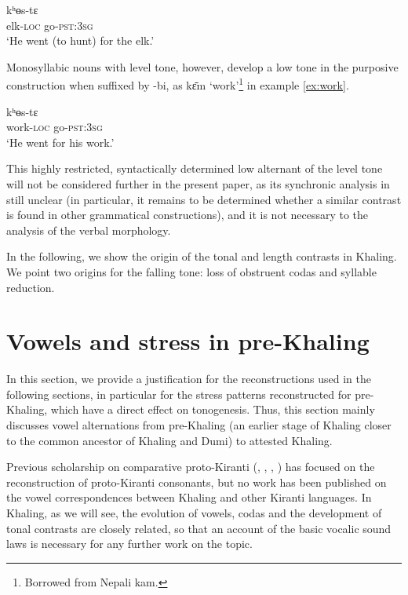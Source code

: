 \documentclass[oldfontcommands,oneside,a4paper,11pt]{article}
\newcommand{\ipa}[1]{{\phon \mbox{#1}}} %
\begin{document}
\begin{exe}
\ex \label{ex:elk}
\gll   \ipa{kɛ̂m-bi} \ipa{kʰɵs-tɛ}  \\
elk-\textsc{loc} go-\textsc{pst:3sg} \\
\glt `He went (to hunt) for the elk.'
\end{exe}


Monosyllabic nouns with level tone, however, develop a low tone in the purposive construction when suffixed by \ipa{-bi}, as \ipa{kɛ̄m}  `work'\footnote{Borrowed from Nepali \ipa{kam}.} in example \ref{ex:work}.
\begin{exe}
\ex \label{ex:work}
\gll   \ipa{kɛ̀m-bi} \ipa{kʰɵs-tɛ}  \\
work-\textsc{loc} go-\textsc{pst:3sg} \\
\glt `He went for his work.'
\end{exe}


This highly restricted, syntactically determined low alternant of the level tone will not be considered further in the present paper, as its synchronic analysis in still unclear (in particular, it remains to be determined whether a similar contrast is found in other grammatical constructions), and it is not necessary to the analysis of the verbal morphology.


In the following, we show the origin of the tonal and length contrasts in Khaling. We point  two origins for the falling tone: loss of obstruent codas and syllable reduction.

\section{Vowels and stress in pre-Khaling}
 In this section, we provide a justification for the reconstructions used in the following sections,   in particular   for the stress patterns reconstructed for pre-Khaling, which have a direct effect on tonogenesis. Thus, this section mainly discusses vowel alternations from pre-Khaling (an earlier stage of Khaling closer to the common ancestor of Khaling and Dumi) to attested Khaling.

Previous scholarship on comparative proto-Kiranti (\citealt{driem90r}, \citealt{michailovsky94stops}, \citealt{starostin94kiranti}, \citealt{opgenort05jero}) has focused on the reconstruction of proto-Kiranti consonants, but no work has been published on the vowel correspondences between Khaling and other Kiranti languages. In Khaling, as we will see, the evolution of vowels, codas and the development of tonal contrasts are closely related, so that an account of the basic vocalic sound laws is necessary for any further work on the topic.
\end{document}
